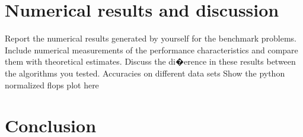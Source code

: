 \documentclass[10pt,twocolumn]{article}
\begin{document}
\section{Numerical results and discussion}
Report the numerical results generated by yourself for the benchmark problems. Include numerical measurements of the performance characteristics and compare them with theoretical estimates. Discuss the di�erence in these results between the algorithms you tested.
Accuracies on different data sets
Show the python normalized flops plot here
\section{Conclusion}







\end{document}
